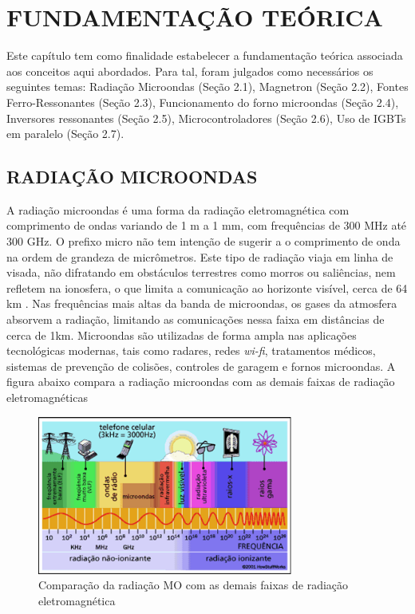 
\chapter{FUNDAMENTAÇÃO TEÓRICA}
\label{chap:fundamentacaoTeorica}

Este capítulo tem como ﬁnalidade estabelecer a fundamentação teórica associada aos conceitos aqui abordados. Para tal, foram julgados como necessários os seguintes temas: Radiação Microondas (Seção 2.1), Magnetron (Seção 2.2), Fontes Ferro-Ressonantes (Seção 2.3), Funcionamento do forno microondas (Seção 2.4), Inversores ressonantes (Seção 2.5), Microcontroladores (Seção 2.6), Uso de IGBTs em paralelo (Seção 2.7).

\section{RADIAÇÃO MICROONDAS}
\label{sec:radiacaoMicroondas}

A radiação microondas é uma forma da radiação eletromagnética com comprimento de ondas variando de 1 m a 1 mm, com frequências de 300 MHz até 300 GHz. O prefixo micro não tem intenção de sugerir a o comprimento de onda na ordem de grandeza de micrômetros. Este tipo de radiação viaja em linha de visada, não difratando em obstáculos terrestres como morros ou saliências, nem refletem na ionosfera, o que limita a comunicação ao horizonte visível, cerca de 64 km \cite{hitchcock}. Nas frequências mais altas da banda de microondas, os gases da atmosfera absorvem a radiação, limitando as comunicações nessa faixa em distâncias de cerca de 1km. Microondas são utilizadas de forma ampla nas aplicações tecnológicas modernas, tais como radares, redes \textit{wi-fi}, tratamentos médicos, sistemas de prevenção de colisões, controles de garagem e fornos microondas. A figura abaixo compara a radiação microondas com as demais faixas de radiação eletromagnéticas

\begin{figure}[!htb]
    \centering
    \includegraphics[width=0.75\textwidth]{./dados/figuras/figura_microondas}
    \caption{Comparação da radiação MO com as demais faixas de radiação eletromagnética}
    \label{fig:figura-mo}
\end{figure}

